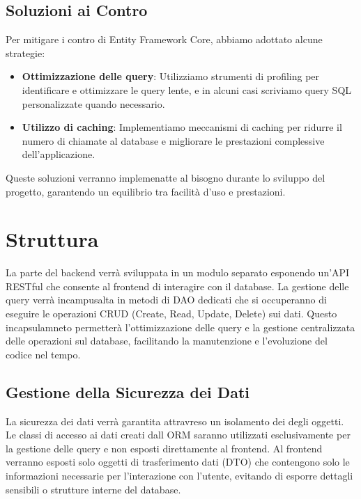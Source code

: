 \documentclass[12pt, a4paper]{article}
\begin{document}
\subsection{Soluzioni ai Contro}
Per mitigare i contro di Entity Framework Core, abbiamo adottato alcune strategie:
\begin{itemize}
    \item \textbf{Ottimizzazione delle query}: Utilizziamo strumenti di profiling per identificare e ottimizzare le query lente, e in alcuni casi scriviamo query SQL personalizzate quando necessario.
    \item \textbf{Utilizzo di caching}: Implementiamo meccanismi di caching per ridurre il numero di chiamate al database e migliorare le prestazioni complessive dell'applicazione.
\end{itemize}
Queste soluzioni verranno implemenatte al bisogno durante lo sviluppo del progetto, garantendo un equilibrio tra facilità d'uso e prestazioni.
\section{Struttura}
La parte del backend verrà sviluppata in un modulo separato esponendo un'API RESTful che consente al frontend di interagire con il database.
La gestione delle query verrà incampusalta in metodi di DAO dedicati che si occuperanno di eseguire le operazioni CRUD (Create, Read, Update, Delete) sui dati.
Questo incapsulamneto permetterà l'ottimizzazione delle query e la gestione centralizzata delle operazioni sul database, facilitando la manutenzione e
l'evoluzione del codice nel tempo.
\subsection{Gestione della Sicurezza dei Dati}
La sicurezza dei dati verrà garantita  attravreso un isolamento dei degli oggetti.
Le classi di accesso ai dati creati dall ORM saranno utilizzati esclusivamente per la gestione delle query e non esposti direttamente al frontend.
Al frontend verranno esposti solo oggetti di trasferimento dati (DTO) che contengono solo le informazioni necessarie per l'interazione con l'utente,
evitando di esporre dettagli sensibili o strutture interne del database.
\end{document}
